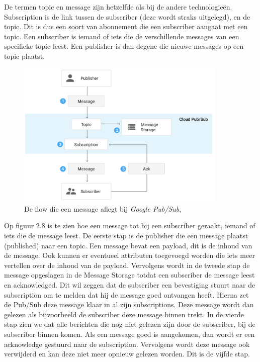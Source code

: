 De termen topic en message zijn hetzelfde als bij de andere technologieën. Subscription is de link tussen de subscriber (deze wordt straks uitgelegd), en de topic. Dit is dus een soort van abonnement die een subscriber aangaat met een topic. Een subscriber is iemand of iets die de verschillende messages van een specifieke topic leest. Een publisher is dan degene die nieuwe messages op een topic plaatst.

 \begin{figure}[h!]
    \centering
    \includegraphics[width=100mm]{../gpsFlow.png}
    \caption{De flow die een message aflegt bij \emph{Google Pub/Sub}, \autocite{Google2019}}
    
\end{figure}

Op figuur 2.8 is te zien hoe een message tot bij een subscriber geraakt, iemand of iets die de message leest. De eerste stap is de publisher die een message plaatst (published) naar een topic. Een message bevat een payload, dit is de inhoud van de message. Ook kunnen er eventueel attributen toegevoegd worden die iets meer vertellen over de inhoud van de payload. Vervolgens wordt in de tweede stap de message opgeslagen in de Message Storage totdat een subscriber de message leest en acknowledged. Dit wil zeggen dat de subscriber een bevestiging stuurt naar de subscription om te melden dat hij de message goed ontvangen heeft. Hierna zet de Pub/Sub deze message klaar in al zijn subscriptions. Deze message wordt dan gelezen als bijvoorbeeld de subscriber deze message binnen trekt. In de vierde stap zien we dat alle berichten die nog niet gelezen zijn door de subscriber, bij de subscriber binnen komen. Als een message goed is aangekomen, dan wordt er een acknowledge gestuurd naar de subscription. Vervolgens wordt deze message ook verwijderd en kan deze niet meer opnieuw gelezen worden. Dit is de vijfde stap.

